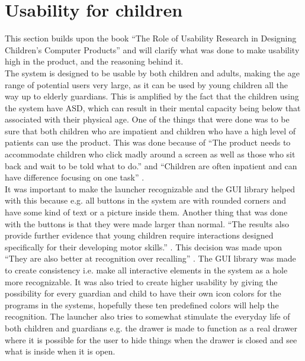 \section{Usability for children}
\label{Preanalysis:Usability_for_children}
This section builds upon the book "`The Role of Usability Research in Designing Children's Computer Products"' and will clarify what was done to make usability high in the product, and the reasoning behind it.\\

The \giraf[] system is designed to be usable by both children and adults, making the age range of potential users very large, as it can be used by young children all the way up to elderly guardians. 
This is amplified by the fact that the children using the system have ASD, which can result in their mental capacity being below that associated with their physical age. \newline
One of the things that were done was to be sure that both children who are impatient and children who have a high level of patients can use the product. 
This was done because of ``The product needs to accommodate children who click madly around a screen as well as those who sit back and wait to be told what to do.'' \citep{microsoft:usability} and ``Children are often inpatient and can have difference focusing on one task'' \citep{microsoft:usability}.\\
It was important to make the launcher recognizable and the \giraf[] GUI library helped with this because e.g. all buttons in the \giraf[] system are with rounded corners and have some kind of text or a picture inside them. 
Another thing that was done with the buttons is that they were made larger than normal. 
``The results also provide further evidence that young children require interactions designed specifically for their developing motor skills.'' \citep[p. 8]{mousesize}.
This decision was made upon ``They are also better at recognition over recalling'' \citep{microsoft:usability}. 
The \giraf[] GUI library was made to create consistency i.e. make all interactive elements in the \giraf[] system as a hole more recognizable. 
It was also tried to create higher usability by giving the possibility for every guardian and child to have their own icon colors for the programs in the \giraf[] systems, hopefully these ten predefined colors will help the recognition. 
The launcher also tries to somewhat stimulate the everyday life of both children and guardians e.g. the drawer is made to function as a real drawer where it is possible for the user to hide things when the drawer is closed and see what is inside when it is open. 
